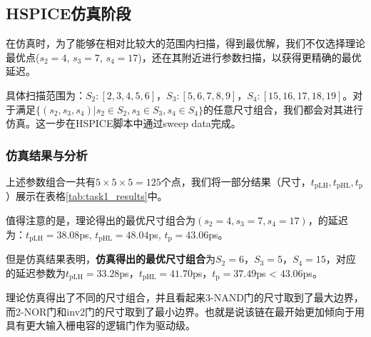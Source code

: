 \documentclass[UTF8,12pt,a4paper]{ctexart}
\begin{document}
\subsection{HSPICE仿真阶段}

在仿真时，为了能够在相对比较大的范围内扫描，得到最优解，我们不仅选择理论最优点($s_2 = 4$, $s_3 = 7$, $s_4 = 17$)，还在其附近进行参数扫描，以获得更精确的最优延迟。

具体扫描范围为：$S_2: [2,3,4,5,6]$，$S_3:[5,6,7,8,9]$，$S_4:[15,16,17,18,19]$。对于满足$\{(s_2, s_3, s_4)| s_2 \in S_2, s_3 \in S_3, s_4 \in S_4\}$的任意尺寸组合，我们都会对其进行仿真。这一步在HSPICE脚本中通过sweep data完成。

\subsubsection{仿真结果与分析}
上述参数组合一共有$5\times5\times5=125$个点，我们将一部分结果（尺寸，$t_{\text{pLH}}, t_{\text{pHL}}, t_{\text{p}}$）展示在表格\ref{tab:task1_results}中。

值得注意的是，理论得出的最优尺寸组合为$(s_2 = 4, s_3 = 7, s_4 = 17)$，的延迟为：$t_{\text{pLH}}=38.08$ps, $t_{\text{pHL}} = 48.04$ps, $t_{\text{p}} = 43.06$ps。

但是仿真结果表明，\textbf{仿真得出的最优尺寸组合}为$S_2 = 6$，$S_3 = 5$，$S_4 = 15$，对应的延迟参数为$t_{\text{pLH}} = 33.28$ps，$t_{\text{pHL}} = 41.70$ps，$t_{\text{p}} = 37.49$ps < $43.06$ps。

理论仿真得出了不同的尺寸组合，并且看起来3-NAND门的尺寸取到了最大边界，而2-NOR门和inv2门的尺寸取到了最小边界。也就是说该链在最开始更加倾向于用具有更大输入栅电容的逻辑门作为驱动级。
\end{document}
